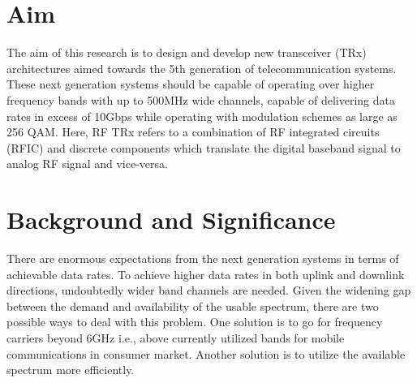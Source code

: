 \documentclass[onecolumn,draftcls,journal]{IEEEtran}
\begin{document}
\IEEEpubidadjcol
\section{Aim}
\vspace{-.09in}
The aim of this research is to design and develop new transceiver (TRx) architectures aimed towards the 5th generation of telecommunication systems. These next generation systems should be capable of operating over higher frequency bands with up to  500MHz wide channels, capable of delivering data rates in excess of 10Gbps while operating with modulation schemes as large as 256 QAM. Here, RF TRx refers to a combination of RF integrated circuits (RFIC) and discrete  components which translate the digital baseband signal to analog RF signal and vice-versa.
%
\IEEEpubidadjcol
\vspace{-.2in}
\section{Background and Significance}
\vspace{-.1in}
There are enormous expectations from the next generation systems in terms of achievable data rates. To achieve higher data rates in both uplink and downlink directions, undoubtedly wider band channels are needed. Given the widening gap between the demand and availability of the usable spectrum, there are two possible ways to deal with this problem. One solution is to go for frequency carriers beyond 6GHz i.e., above currently utilized bands for mobile communications in consumer market. Another solution is to utilize the available spectrum more efficiently.
\end{document}
